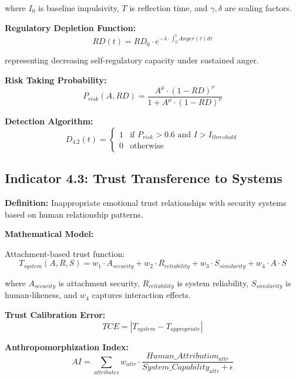 \documentclass[11pt,a4paper]{article}
\begin{document}
where $I_0$ is baseline impulsivity, $T$ is reflection time, and $\gamma, \delta$ are scaling factors.

\textbf{Regulatory Depletion Function:}
\begin{equation}
RD(t) = RD_0 \cdot e^{-\lambda \cdot \int_0^t Anger(\tau) d\tau}
\end{equation}

representing decreasing self-regulatory capacity under sustained anger.

\textbf{Risk Taking Probability:}
\begin{equation}
P_{risk}(A,RD) = \frac{A^{\mu} \cdot (1 - RD)^{\nu}}{1 + A^{\mu} \cdot (1 - RD)^{\nu}}
\end{equation}

\textbf{Detection Algorithm:}
\begin{equation}
D_{4.2}(t) = \begin{cases}
1 & \text{if } P_{risk} > 0.6 \text{ and } I > I_{threshold} \\
0 & \text{otherwise}
\end{cases}
\end{equation}

\subsection{Indicator 4.3: Trust Transference to Systems}

\textbf{Definition:} Inappropriate emotional trust relationships with security systems based on human relationship patterns.

\textbf{Mathematical Model:}

Attachment-based trust function:
\begin{equation}
T_{system}(A,R,S) = w_1 \cdot A_{security} + w_2 \cdot R_{reliability} + w_3 \cdot S_{similarity} + w_4 \cdot A \cdot S
\end{equation}

where $A_{security}$ is attachment security, $R_{reliability}$ is system reliability, $S_{similarity}$ is human-likeness, and $w_4$ captures interaction effects.

\textbf{Trust Calibration Error:}
\begin{equation}
TCE = |T_{system} - T_{appropriate}|
\end{equation}

\textbf{Anthropomorphization Index:}
\begin{equation}
AI = \sum_{attributes} w_{attr} \cdot \frac{Human\_Attribution_{attr}}{System\_Capability_{attr} + \epsilon}
\end{equation}
\end{document}

